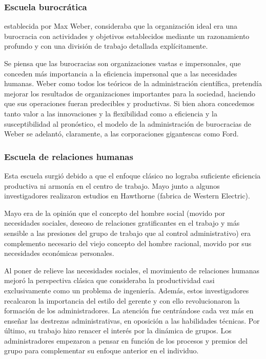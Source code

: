 \documentclass[titlepage,a4paper]{article}
\begin{document}
\subsubsection*{Escuela burocrática}
establecida por Max Weber, consideraba que la organización ideal era una burocracia con actividades y objetivos establecidos mediante un razonamiento profundo y con una división de trabajo detallada explícitamente.

Se piensa que las burocracias son organizaciones vastas e impersonales, que conceden más importancia a la eficiencia impersonal que a las necesidades humanas. Weber como todos los teóricos de la administración científica, pretendía mejorar los resultados de organizaciones importantes para la sociedad, haciendo que sus operaciones fueran predecibles y productivas. Si bien ahora concedemos tanto valor a las innovaciones y la flexibilidad como a eficiencia y la susceptibilidad al pronóstico, el modelo de la administración de burocracias de Weber se adelantó, claramente, a las corporaciones gigantescas como Ford.

\subsubsection*{Escuela de relaciones humanas}
Esta escuela surgió debido a que el enfoque clásico no lograba suficiente eficiencia productiva ni armonía en el centro de trabajo. Mayo junto a algunos investigadores realizaron estudios en Hawthorne (fabrica de Western Electric).

Mayo era de la opinión que el concepto del hombre social (movido por necesidades sociales, deseoso de relaciones gratificantes en el trabajo y más sensible a las presiones del grupo de trabajo que al control administrativo) era complemento necesario del viejo concepto del hombre racional, movido por sus necesidades económicas personales. 

Al poner de relieve las necesidades sociales, el movimiento de relaciones humanas mejoró la perspectiva clásica que consideraba la productividad casi exclusivamente como un problema de ingeniería. Además, estos investigadores recalcaron la importancia del estilo del gerente y con ello revolucionaron la formación de los administradores. La atención fue centrándose cada vez más en enseñar las destrezas administrativas, en oposición a las habilidades técnicas. Por último, su trabajo hizo renacer el interés por la dinámica de grupos. Los administradores empezaron a pensar en función de los procesos y premios del grupo para complementar su enfoque anterior en el individuo.
\end{document}
